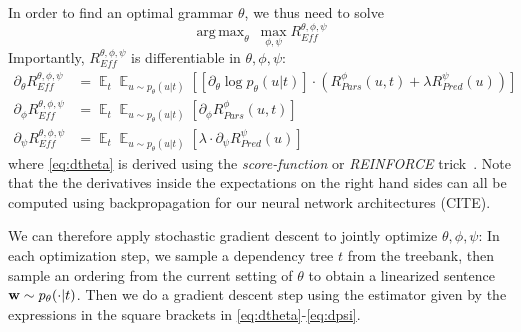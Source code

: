 \documentclass[10pt,twoside,lineno]{article}
\DeclareMathOperator*{\argmax}{arg\,max}
\DeclareMathOperator{\E}{\mathop{\mathbb{E}}}
\begin{document}
%
In order to find an optimal grammar $\theta$, we thus need to solve
\begin{equation}\label{eq:efficiency}
\argmax_\theta\	\max_{\phi, \psi} R_{\textit{Eff}}^{\theta, \phi, \psi} %
\end{equation}
Importantly, $R_{\textit{Eff}}^{\theta, \phi, \psi}$ is differentiable in $\theta, \phi, \psi$: %
\begin{align}
\partial_\theta R_{\textit{Eff}}^{\theta, \phi, \psi} &= \E_t \E_{u \sim p_\theta(u|t)} \left[  \left[\partial_\theta \log p_\theta(u|t)\right] \cdot    \left(R_{Pars}^{\phi}(u,t) + \lambda R_{Pred}^{\psi}(u)\right) \right] \label{eq:dtheta}\\ 
\partial_\phi R_{\textit{Eff}}^{\theta, \phi, \psi} &= \E_t \E_{u \sim p_\theta(u|t)}  \left[\partial_\phi R_{Pars}^{\phi}(u,t)\right] \\
\partial_\psi R_{\textit{Eff}}^{\theta, \phi, \psi} &= \E_t \E_{u \sim p_\theta(u|t)}  \left[\lambda \cdot \partial_\psi R_{Pred}^{\psi}(u)\right] \label{eq:dpsi}
\end{align}
where \ref{eq:dtheta} is derived using the \emph{score-function} or \emph{REINFORCE} trick~\cite{williams1992simple}.
Note that the the derivatives inside the expectations on the right hand sides can all be computed using backpropagation for our neural network architectures (CITE).

We can therefore apply stochastic gradient descent to jointly optimize $\theta, \phi, \psi$:
In each optimization step, we sample a dependency tree $t$ from the treebank, then sample an ordering from the current setting of $\theta$ to obtain a linearized sentence ${\bf w} \sim p_{\theta}(\cdot|t)$.
Then we %
do a gradient descent step using the estimator given by the expressions in the square brackets in \ref{eq:dtheta}-\ref{eq:dpsi}.
\end{document}
